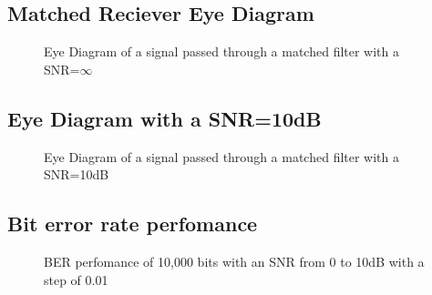 \subsection{Matched Reciever Eye Diagram}

\begin{figure}[h]
    \begin{center}
        
    \end{center}
    \caption{Eye Diagram of a signal passed through a matched filter with a SNR=$\infty$}
\end{figure}

\subsection{Eye Diagram with a SNR=10dB}

\begin{figure}[h]
    \begin{center}
        
    \end{center}
    \caption{Eye Diagram of a signal passed through a matched filter with a SNR=10dB}
\end{figure}

\subsection{Bit error rate perfomance}

\begin{figure}[h]
    \begin{center}
        
    \end{center}
    \caption{BER perfomance of 10,000 bits with an SNR from 0 to 10dB with a step of 0.01}
\end{figure}
